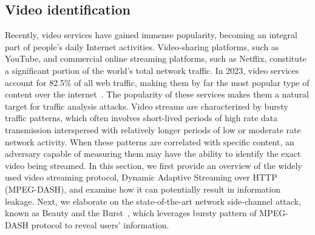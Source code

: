 
\subsection{Video identification}\label{subsec:video-classification}
Recently, video services have gained immense popularity, becoming an integral part of people's daily Internet activities.
Video-sharing platforms, such as YouTube, and commercial online streaming platforms, such as Netflix, constitute a significant portion of the world's total network traffic.
In 2023, video services account for 82.5\% of all web traffic, making them by far the most popular type of content over the internet~\cite{webstat}.
The popularity of these services makes them a natural target for traffic analysis attacks.
Video streams are characterized by bursty traffic patterns, which often involves short-lived periods of high rate data transmission interspersed with relatively longer periods of low or moderate rate network activity.
When these patterns are correlated with specific content, an adversary capable of measuring them may have the ability to identify the exact video being streamed.
In this section, we first provide an overview of the widely used video streaming protocol, Dynamic Adaptive Streaming over HTTP (MPEG-DASH), and examine how it can potentially result in information leakage. 
Next, we elaborate on the state-of-the-art network side-channel attack, known as Beauty and the Burst~\cite{schuster2017beautyburst}, which leverages bursty pattern of MPEG-DASH protocol to reveal users' information. 

